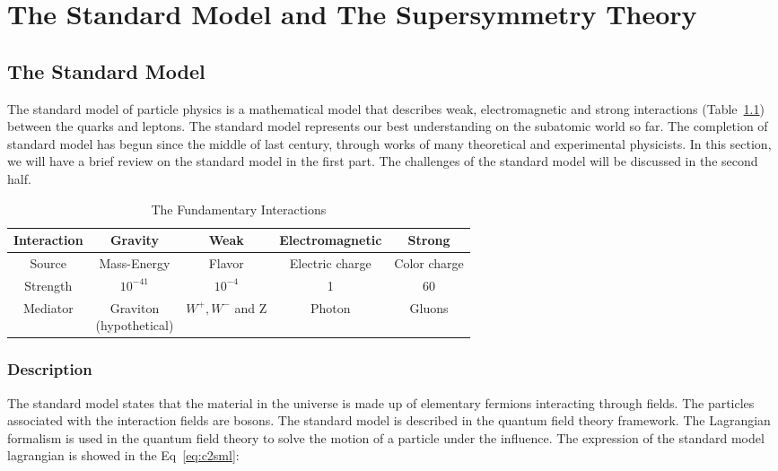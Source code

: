 \chapter{The Standard Model and The Supersymmetry Theory}
\clearpage
\section{The Standard Model}
The standard model of particle physics is a mathematical model that describes weak, electromagnetic and strong interactions (Table~\ref{tab:c24ei}) between the quarks and leptons. The standard model represents our best understanding on the subatomic world so far. The completion of standard model has begun since the middle of last century, through works of many theoretical and experimental physicists. In this section, we will have a brief review on the standard model in the first part. The challenges of the standard model will be discussed in the second half. 

\begin{table}[htbp]
\fontsize{10 pt}{1.2 em}
\selectfont
\begin{centering}
\caption{\label{tab:c24ei} The Fundamentary Interactions}
\hspace*{-4ex}
\begin{tabular}{|c|c|c|c|c|}
\hline
Interaction & Gravity & Weak & Electromagnetic & Strong \\
\hline
Source      & Mass-Energy & Flavor & Electric charge & Color charge \\
\hline
Strength    & $10^{-41}$ & $10^{-4}$ & 1 & 60 \\
\hline
Mediator    & \specialcell{Graviton\\(hypothetical)} & $W^{+},W^{-}$ and Z & Photon & Gluons \\
\hline
\end{tabular}
\par\end{centering}
\end{table}

\clearpage
\subsection{Description}

The standard model states that the material in the universe is made up of elementary fermions interacting through fields. The particles associated with the interaction fields are bosons. The standard model is described in the quantum field theory framework. The Lagrangian formalism is used in the quantum field theory to solve the motion of a particle under the influence. The expression of the standard model lagrangian is showed in the Eq~\ref{eq:c2sml}: 

